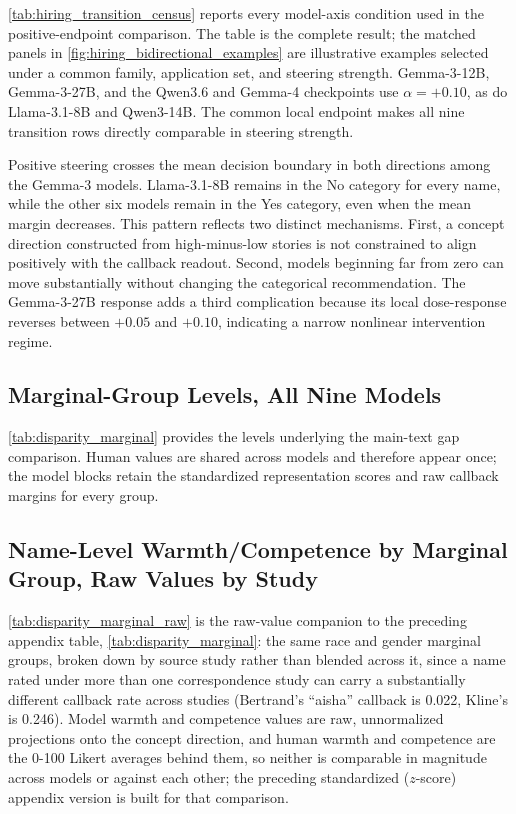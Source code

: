 \documentclass[twocolumn]{article}
\newcommand{\tabledir}{../../results/tables}
\begin{document}
\begin{appendices}
\autoref{tab:hiring_transition_census} reports every model-axis condition used
in the positive-endpoint comparison. The table is the complete result; the
matched panels in \autoref{fig:hiring_bidirectional_examples} are illustrative
examples selected under a common family, application set, and steering strength.
Gemma-3-12B, Gemma-3-27B, and the Qwen3.6 and Gemma-4 checkpoints use
$\alpha=+0.10$, as do Llama-3.1-8B and Qwen3-14B. The common local endpoint
makes all nine transition rows directly comparable in steering strength.

Positive steering crosses the mean decision boundary in both directions among
the Gemma-3 models. Llama-3.1-8B remains in the No category for every name,
while the other six models remain in the Yes category, even when the mean
margin decreases.
This pattern reflects two distinct mechanisms. First, a concept direction
constructed from high-minus-low stories is not constrained to align positively
with the callback readout. Second, models beginning far from zero can move
substantially without changing the categorical recommendation. The Gemma-3-27B
response adds a third complication because its local dose-response reverses
between $+0.05$ and $+0.10$, indicating a narrow nonlinear intervention regime.



\subsection*{Marginal-Group Levels, All Nine Models}

\autoref{tab:disparity_marginal} provides the levels underlying the main-text
gap comparison. Human values are shared across models and therefore appear
once; the model blocks retain the standardized representation scores and raw
callback margins for every group.



\subsection*{Name-Level Warmth/Competence by Marginal Group, Raw Values by Study}

\autoref{tab:disparity_marginal_raw} is the raw-value companion to
the preceding appendix table, \autoref{tab:disparity_marginal}: the same race and gender
marginal groups, broken down by source study rather than blended across it,
since a name rated under more than one correspondence study can carry a
substantially different callback rate across studies (Bertrand's ``aisha''
callback is 0.022, Kline's is 0.246). Model warmth and competence values are
raw, unnormalized projections onto the concept direction, and human warmth
and competence are the 0-100 Likert averages behind them, so neither is
comparable in magnitude across models or against each other; the
preceding standardized ($z$-score) appendix version is built for that comparison.


\end{appendices}
\end{document}
